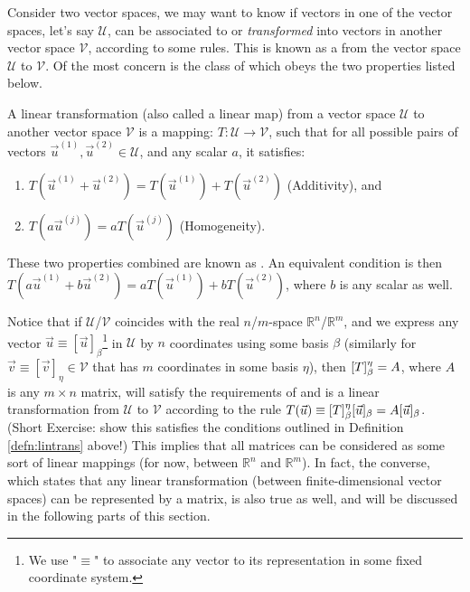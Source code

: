 Consider two vector spaces, we may want to know if vectors in one of the vector spaces, let's say $\mathcal{U}$, can be associated to or \textit{transformed} into vectors in another vector space $\mathcal{V}$, according to some rules. This is known as a  from the vector space $\mathcal{U}$ to $\mathcal{V}$. Of the most concern is the class of  which obeys the two properties listed below.
\begin{defn}
\label{defn:lintrans}
A linear transformation (also called a linear map) from a vector space $\mathcal{U}$ to another vector space $\mathcal{V}$ is a mapping: $T: \mathcal{U} \to \mathcal{V}$, such that for all possible pairs of vectors $\vec{u}^{(1)}, \vec{u}^{(2)} \in \mathcal{U}$, and any scalar $a$, it satisfies:
\begin{enumerate}
    \item $T(\vec{u}^{(1)} + \vec{u}^{(2)}) = T(\vec{u}^{(1)}) + T(\vec{u}^{(2)})$ (Additivity), and
    \item $T(a\vec{u}^{(j)}) = aT(\vec{u}^{(j)})$ (Homogeneity).
\end{enumerate}
These two properties combined are known as . An equivalent condition is then $T(a\vec{u}^{(1)} + b\vec{u}^{(2)}) = aT(\vec{u}^{(1)}) + bT(\vec{u}^{(2)})$, where $b$ is any scalar as well.
\end{defn}
Notice that if $\mathcal{U}$/$\mathcal{V}$ coincides with the real $n$/$m$-space $\mathbb{R}^n$/$\mathbb{R}^m$, and we express any vector $\vec{u} \equiv [\vec{u}]_\beta$\footnote{We use "$\equiv$" to associate any vector to its representation in some fixed coordinate system.} in $\mathcal{U}$ by $n$ coordinates using some basis $\mathcal{\beta}$ (similarly for $\vec{v} \equiv [\vec{v}]_{\eta} \in \mathcal{V}$ that has $m$ coordinates in some basis $\mathcal{\eta}$), then $\smash{[T]_\beta^{\eta}} = A$, where $A$ is any $m \times n$ matrix, will satisfy the requirements of and is a linear transformation from $\mathcal{U}$ to $\mathcal{V}$ according to the rule $T(\vec{u}) \equiv \smash{[T]_\beta^{\eta}}[\vec{u}]_\beta = A[\vec{u}]_\beta$. (Short Exercise: show this satisfies the conditions outlined in Definition \ref{defn:lintrans} above!\footnotemark) This implies that all matrices can be considered as some sort of linear mappings (for now, between $\mathbb{R}^n$ and $\mathbb{R}^m$). In fact, the converse, which states that any linear transformation (between finite-dimensional vector spaces) can be represented by a matrix, is also true as well, and will be discussed in the following parts of this section. \par
